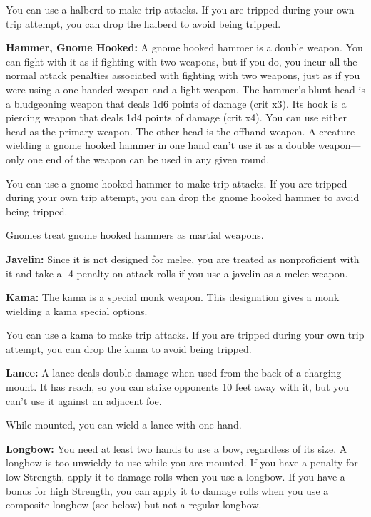 \documentclass{article}
\begin{document}
You can use a halberd to make trip attacks. If you are tripped during your own 
trip attempt, you can drop the halberd to avoid being tripped.

\textbf{Hammer, Gnome Hooked:} A gnome hooked hammer is a double weapon. You can 
fight with it as if fighting with two weapons, but if you do, you incur all the 
normal attack penalties associated with fighting with two weapons, just as if you 
were using a one-handed weapon and a light weapon. The hammer's blunt head is a 
bludgeoning weapon that deals 1d6 points of damage (crit x3). Its hook is a piercing 
weapon that deals 1d4 points of damage (crit x4). You can use either head as the 
primary weapon. The other head is the offhand weapon. A creature wielding a gnome 
hooked hammer in one hand can't use it as a double weapon---only one end of the 
weapon can be used in any given round.

You can use a gnome hooked hammer to make trip attacks. If you are tripped during 
your own trip attempt, you can drop the gnome hooked hammer to avoid being tripped.

Gnomes treat gnome hooked hammers as martial weapons.

\textbf{Javelin:} Since it is not designed for melee, you are treated as nonproficient 
with it and take a -4 penalty on attack rolls if you use a javelin as a melee weapon.

\textbf{Kama:} The kama is a special monk weapon. This designation gives a monk 
wielding a kama special options.

You can use a kama to make trip attacks. If you are tripped during your own trip 
attempt, you can drop the kama to avoid being tripped.

\textbf{Lance:} A lance deals double damage when used from the back of a charging 
mount. It has reach, so you can strike opponents 10 feet away with it, but you 
can't use it against an adjacent foe.

While mounted, you can wield a lance with one hand.

\textbf{Longbow:} You need at least two hands to use a bow, regardless of its size. 
A longbow is too unwieldy to use while you are mounted. If you have a penalty for 
low Strength, apply it to damage rolls when you use a longbow. If you have a bonus 
for high Strength, you can apply it to damage rolls when you use a composite longbow 
(see below) but not a regular longbow.
\end{document}
